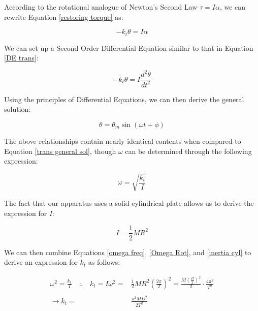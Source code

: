 \documentclass[12pt]{article}
\begin{document}
\noindent According to the rotational analogue of Newton's Second Law $\tau=I\alpha$, we can rewrite Equation \ref{restoring torque} as:

\begin{equation}
    -k_t\theta=I\alpha
\end{equation}

\noindent We can set up a Second Order Differential Equation similar to that in Equation \ref{DE trans}:

\begin{equation}
    -k_t\theta=I\frac{d^2\theta}{dt^2} \label{DE angular}
\end{equation}

\noindent Using the principles of Differential Equations, we can then derive the general solution:

\begin{equation}
    \theta = \theta_m\sin(\omega t+\phi) \label{angular general sol}
\end{equation}

The above relationships contain nearly identical contents when compared to Equation \ref{trans general sol}, though $\omega$ can be determined through the following expression:

\begin{equation}
    \omega=\sqrt{\frac{k_t}{I}} \label{Omega Rot}
\end{equation}

The fact that our apparatus uses a solid cylindrical plate allows us to derive the expression for $I$:

\begin{equation}
    I=\frac{1}{2}MR^2 \label{inertia cyl}
\end{equation}

We can then combine Equations \ref{omega freq}, \ref{Omega Rot}, and \ref{inertia cyl} to derive an expression for $k_t$ as follows:

\begin{equation}
    \begin{split}
        \omega^2=\frac{k_t}{I}\quad\therefore\quad k_t=I\omega^2=&\frac{1}{2}MR^2(\frac{2\pi}{T})^2=\frac{M(\frac{D}{2})^2}{2}\cdot\frac{4\pi^2}{T^2} \\ \\
        \rightarrow k_t=& \frac{\pi^2MD^2}{2T^2} \label{kt derivation}
    \end{split}
\end{equation}
\end{document}
